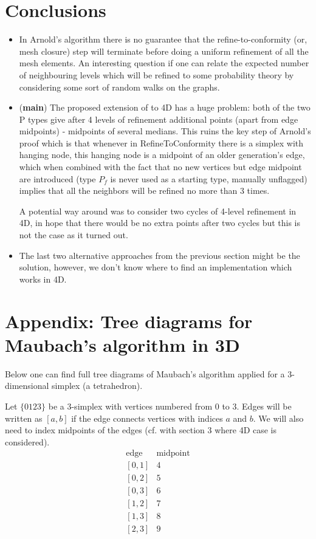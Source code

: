 \documentclass[a4paper,12pt]{amsart}
\numberwithin{equation}{section}
\begin{document}
\section{Conclusions}
\begin{itemize}
	\item In Arnold's algorithm there is no guarantee that the refine-to-conformity (or, mesh closure) step will terminate before doing a uniform refinement of all the mesh elements. An interesting question if one can relate the expected number of neighbouring levels which will be refined to some probability theory by considering some sort of random walks on the graphs.
	\item (\textbf{main}) The proposed extension of \cite{arnold} to 4D has a huge problem: both of the two P types give after 4 levels of refinement additional points (apart from edge midpoints) - midpoints of several medians. This ruins the key step of Arnold's proof which is that whenever in RefineToConformity there is a simplex with hanging node, this hanging node is a midpoint of an older generation's edge, which when combined with the fact that no new vertices but edge midpoint are introduced (type $P_f$ is never used as a starting type, manually unflagged) implies that all the neighbors will be refined no more than 3 times.
	
	A potential way around was to consider two cycles of 4-level refinement in 4D, in hope that there would be no extra points after two cycles but this is not the case as it turned out.
	\item The last two alternative approaches from the previous section might be the solution, however, we don't know where to find an implementation which works in 4D.

\end{itemize}

\section{Appendix: Tree diagrams for Maubach's algorithm in 3D}

Below one can find full tree diagrams of Maubach's algorithm applied for a 3-dimensional simplex (a tetrahedron).

Let $\{0123\}$ be a 3-simplex with vertices numbered from 0 to 3. Edges will be written as $[a,b]$ if the edge connects vertices with indices $a$ and $b$.
We will also need to index midpoints of the edges (cf. with section 3 where 4D case is considered). 
$$
\begin{array}{cc}
\mbox{edge} & \mbox{midpoint} \\
\left[0,1\right] & 4 \\
\left[0,2\right] & 5 \\
\left[0,3\right] & 6 \\
\left[1,2\right] & 7 \\
\left[1,3\right] & 8 \\
\left[2,3\right] & 9 \\
\end{array}
$$
\end{document}

